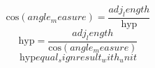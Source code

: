 \[\text{{cos}}({angle_measure})=\frac{{{adj_length}}}{{\text{{{hyp}}}}}\]
\[\text{{{hyp}}}=\frac{{{adj_length}}}{{\text{{cos}}({angle_measure})}}\]
\[\text{{{hyp}}}{equal_sign}{result_with_unit}\]
